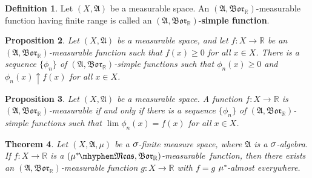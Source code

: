 \documentclass[
twoside=true,
paper=letter,
fontsize=9pt,
pagesize=auto,
leqno,
openany,
headsepline,
overfullrule,
]{scrbook}
\theoremstyle{plain}
\newtheorem{thm}{Theorem}[chapter]
\theoremstyle{plain}
\newtheorem{prop}[thm]{Proposition}
\theoremstyle{definition}
\newtheorem{defn}[thm]{Definition}
\theoremstyle{bfnoteitalic}
\theoremstyle{bfnoteroman}
\newcommand{\term}[1]{\textbf{#1}\index{#1}}
\newcommand{\sigalg}[1]{\mathfrak{#1}}
\newcommand{\borel}{\mathfrak{Bor}}
\newcommand{\textsigma}{\hbox{\large{$\sigma$}}\kern-1pt}
\newcommand{\R}{\mathbb{R}}
\newcommand{\sigmaalgebra}{\sigalg{A}}
\newcommand{\measurable}[1]{{#1}\mhyphen\mathfrak{Meas}}
\newcommand{\kernast}{\ast\kern-1pt}
\newcommand{\mbmeasurable}{$(\measurable{\measure^\kernast},\borel_\R)$\hyp{}measurable}
\newcommand{\measurespace}{X}
\newcommand{\measure}{\mu}
\begin{document}
\begin{defn}\label{simple_function}
Let $(\measurespace, \sigmaalgebra)$ be a measurable space.
An $(\sigmaalgebra, \borel_\R)$\hyp{}measurable function  having finite range is called an $(\sigmaalgebra, \borel_\R)$\hyp{}\term{simple function}.
\end{defn}



\begin{prop}\label{measurable_implies_simple_function_limit}
Let $(\measurespace, \sigmaalgebra)$ be a measurable space, and let $f:\measurespace\to\R$ be an $(\sigmaalgebra, \borel_\R)$\hyp{}measurable function such that $f(x)\geq 0$ for all $x\in\measurespace$. 
There is a sequence $\{\phi_n\}$ of $(\sigmaalgebra, \borel_\R)$-simple functions such that $\phi_n(x)\geq 0$ and $\phi_n(x)\uparrow f(x)$ for all $x\in\measurespace$.
\end{prop}



\begin{prop}\label{measurable_equivalent_simple_function_limit}
Let $(\measurespace, \sigmaalgebra)$ be a measurable space.
A function $f:\measurespace\to\R$ is $(\sigmaalgebra,\borel_\R)$\hyp{}measurable if and only if there is a sequence $\{\phi_n\}$ of $(\sigmaalgebra, \borel_\R)$-simple functions such that $\lim \phi_n(x) = f(x)$ for all $x\in\measurespace$.
\end{prop}



\begin{thm}\label{mixing_measurable_functions}
Let $(\measurespace, \sigmaalgebra, \measure)$ be a $\textsigma$-finite measure space, where $\sigmaalgebra$ is a $\textsigma$-algebra.  If $f:\measurespace\to\R$ is a \mbmeasurable\ function, then there exists an $(\sigmaalgebra,\borel_\R)$\hyp{}measurable function $g:\measurespace\to\R$ with $f=g$ $\measure^\kernast$-almost everywhere.
\end{thm}
\end{document}
